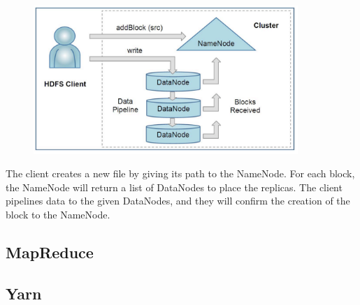 \begin{figure}[H]
	\includegraphics[width=100mm, keepaspectratio]{figures/hdfs_client.png}
	\centering
\end{figure}
The client creates a new file by giving its path to the NameNode. For each block, the NameNode will return a list of DataNodes to place the replicas. The client pipelines data to the given DataNodes, and they will confirm the creation of the block to the NameNode.
\subsection{MapReduce}
\subsection{Yarn}